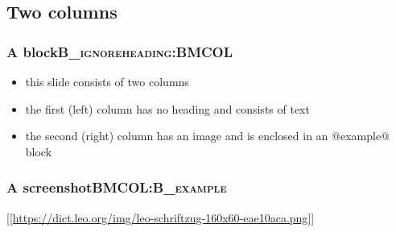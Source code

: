 \documentclass[bigger]{beamer}
\begin{document}
\subsection{Two columns}
\label{sec-2-2}

\subsubsection[A block]{A block\hfill{}\textsc{B_ignoreheading:BMCOL}}
\label{sec-2-2-1}
\begin{itemize}
\item this slide consists of two columns
\item the first (left) column has no heading and consists of text
\item the second (right) column has an image and is enclosed in an
@example@ block
\end{itemize}

\subsubsection[A screenshot]{A screenshot\hfill{}\textsc{BMCOL:B_example}}
\label{sec-2-2-2}
[[\url{https://dict.leo.org/img/leo-schriftzug-160x60-eae10aca.png}]]
\end{document}
